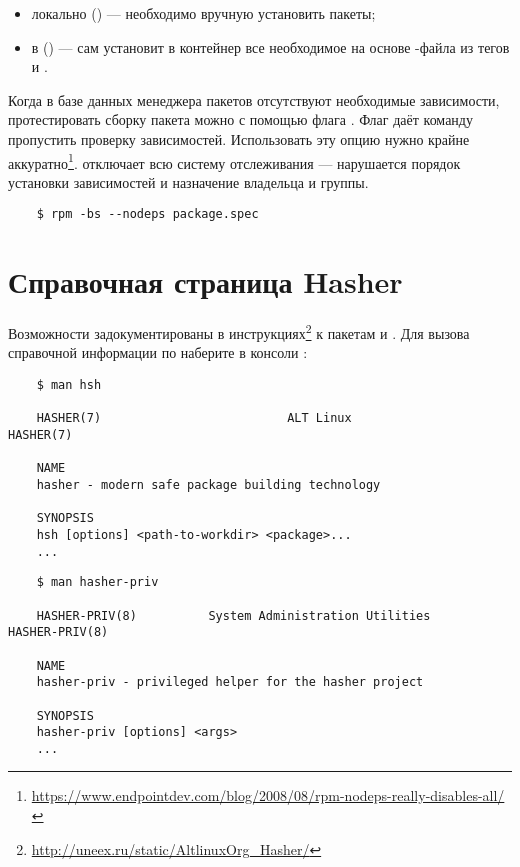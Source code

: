 \begin{itemize}
	\item локально () --- необходимо вручную установить пакеты;
	\item в  () ---  сам установит в контейнер все необходимое на основе -файла из тегов  и .
\end{itemize} 

Когда в базе данных менеджера пакетов отсутствуют необходимые зависимости, протестировать сборку пакета можно с помощью флага . Флаг  даёт команду пропустить проверку зависимостей. Использовать эту опцию нужно крайне аккуратно\footnote{\href{https://www.endpointdev.com/blog/2008/08/rpm-nodeps-really-disables-all/}{https://www.endpointdev.com/blog/2008/08/rpm-nodeps-really-disables-all/}}.  отключает всю систему отслеживания  --- нарушается порядок установки зависимостей и назначение владельца и группы.

\begin{verbatim}
	$ rpm -bs --nodeps package.spec
\end{verbatim} 

\section{Справочная страница Hasher}
Возможности  задокументированы в инструкциях\footnote{\href{http://uneex.ru/static/AltlinuxOrg_Hasher/}{http://uneex.ru/static/AltlinuxOrg\_Hasher/}} к пакетам  и . Для вызова справочной информации по  наберите в консоли :
\begin{verbatim}
	$ man hsh
	
	HASHER(7)                          ALT Linux                         HASHER(7)
	
	NAME
	hasher - modern safe package building technology
	
	SYNOPSIS
	hsh [options] <path-to-workdir> <package>...
	...
\end{verbatim} 

\begin{verbatim}
	$ man hasher-priv
	
	HASHER-PRIV(8)          System Administration Utilities         HASHER-PRIV(8)
	
	NAME
	hasher-priv - privileged helper for the hasher project
	
	SYNOPSIS
	hasher-priv [options] <args>
	...
\end{verbatim}

